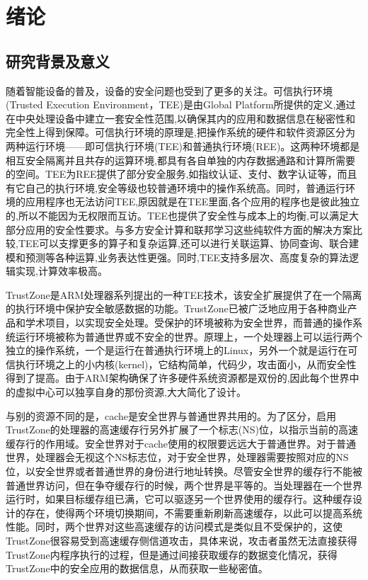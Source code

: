 \chapter{绪论}
\section{研究背景及意义}
随着智能设备的普及，设备的安全问题也受到了更多的关注。可信执行环境(Trusted Execution Environment，TEE)是由Global Platform所提供的定义,通过在中央处理设备中建立一套安全性范围,以确保其内的应用和数据信息在秘密性和完全性上得到保障。可信执行环境的原理是,把操作系统的硬件和软件资源区分为两种运行环境——即可信执行环境(TEE)和普通执行环境(REE)。这两种环境都是相互安全隔离并且共存的运算环境,都具有各自单独的内存数据通路和计算所需要的空间。TEE为REE提供了部分安全服务,如指纹认证、支付、数字认证等，而且有它自己的执行环境,安全等级也较普通环境中的操作系统高。同时，普通运行环境的应用程序也无法访问TEE,原因就是在TEE里面,各个应用的程序也是彼此独立的,所以不能因为无权限而互访。TEE也提供了安全性与成本上的均衡,可以满足大部分应用的安全性要求。与多方安全计算和联邦学习这些纯软件方面的解决方案比较,TEE可以支撑更多的算子和复杂运算,还可以进行关联运算、协同查询、联合建模和预测等各种运算,业务表达性更强。同时,TEE支持多层次、高度复杂的算法逻辑实现,计算效率极高。

TrustZone是ARM处理器系列提出的一种TEE技术，该安全扩展提供了在一个隔离的执行环境中保护安全敏感数据的功能。TrustZone已被广泛地应用于各种商业产品和学术项目\cite{zhang2016case,azab2014hypervision,zhou2014armlock,jang2015secret}，以实现安全处理。受保护的环境被称为安全世界，而普通的操作系统运行环境被称为普通世界或不安全的世界。原理上，一个处理器上可以运行两个独立的操作系统，一个是运行在普通执行环境上的Linux，另外一个就是运行在可信执行环境之上的小内核(kernel)，它结构简单，代码少，攻击面小，从而安全性得到了提高。由于ARM架构确保了许多硬件系统资源都是双份的,因此每个世界中的虚拟中心可以独享自身的那份资源,大大简化了设计。

与别的资源不同的是，cache是安全世界与普通世界共用的。为了区分，启用TrustZone的处理器的高速缓存行另外扩展了一个标志(NS)位，以指示当前的高速缓存行的作用域。安全世界对于cache使用的权限要远远大于普通世界。对于普通世界，处理器会无视这个NS标志位，对于安全世界，处理器需要按照对应的NS位，以安全世界或者普通世界的身份进行地址转换。尽管安全世界的缓存行不能被普通世界访问，但在争夺缓存行的时候，两个世界是平等的。当处理器在一个世界运行时，如果目标缓存组已满，它可以驱逐另一个世界使用的缓存行。这种缓存设计的存在，使得两个环境切换期间，不需要重新刷新高速缓存，以此可以提高系统性能。同时，两个世界对这些高速缓存的访问模式是类似且不受保护的，这使TrustZone很容易受到高速缓存侧信道攻击，具体来说，攻击者虽然无法直接获得TrustZone内程序执行的过程，但是通过间接获取缓存的数据变化情况，获得TrustZone中的安全应用的数据信息，从而获取一些秘密值。

